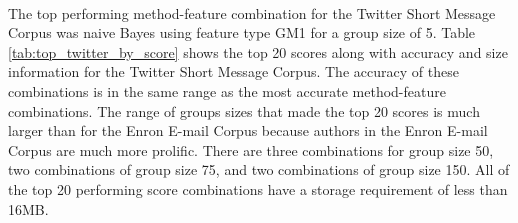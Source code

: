 \paragraph*{}  The top performing method-feature combination for the Twitter Short Message Corpus was naive Bayes using feature type GM1 for a group size of 5.  Table \ref{tab:top_twitter_by_score} shows the top 20 scores along with accuracy and size information for the Twitter Short Message Corpus.  The accuracy of these combinations is in the same range as the most accurate method-feature combinations. The range of groups sizes that made the top 20 scores is much larger than for the Enron E-mail Corpus because authors in the Enron E-mail Corpus are much more prolific.  There are three combinations for group size 50, two combinations of group size 75, and two combinations of group size 150. All of the top 20 performing score combinations have a storage requirement of less than 16MB.

